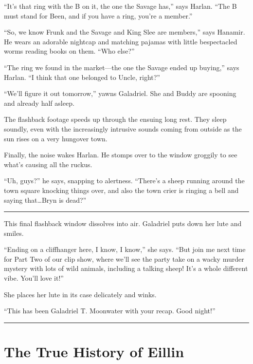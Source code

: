 \documentclass[smalldemyvopaper,11pt,twoside,onecolumn,openright,extrafontsizes]{memoir}
\begin{document}
``It's that ring with the B on it, the one the Savage has,'' says
Harlan. ``The B must stand for Been, and if you have a ring, you're a
member.''

``So, we know Frunk and the Savage and King Slee are members,'' says
Hanamir. He wears an adorable nightcap and matching pajamas with little
bespectacled worms reading books on them. ``Who else?''

``The ring we found in the market---the one the Savage ended up
buying,'' says Harlan. ``I think that one belonged to Uncle, right?''

``We'll figure it out tomorrow,'' yawns Galadriel. She and Buddy are
spooning and already half asleep.

The flashback footage speeds up through the ensuing long rest. They
sleep soundly, even with the increasingly intrusive sounds coming from
outside as the sun rises on a very hungover town.

Finally, the noise wakes Harlan. He stomps over to the window groggily
to see what's causing all the ruckus.

``Uh, guys?'' he says, snapping to alertness. ``There's a sheep running
around the town square knocking things over, and also the town crier is
ringing a bell and saying that\ldots Bryn is dead?''

\begin{center}\rule{0.5\linewidth}{\linethickness}\end{center}

This final flashback window dissolves into air. Galadriel puts down her
lute and smiles.

``Ending on a cliffhanger here, I know, I know,'' she says. ``But join
me next time for Part Two of our clip show, where we'll see the party
take on a wacky murder mystery with lots of wild animals, including a
talking sheep! It's a whole different vibe. You'll love it!''

She places her lute in its case delicately and winks.

``This has been Galadriel T. Moonwater with your recap. Good night!''

\begin{center}\rule{0.5\linewidth}{\linethickness}\end{center}

\hypertarget{the-true-history-of-eillin}{%
\section{The True History of Eillin}\label{the-true-history-of-eillin}}
\end{document}
